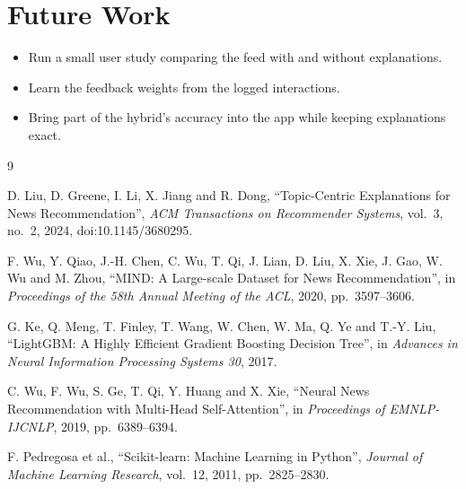 \documentclass[12pt,a4paper,oneside]{report}
\begin{document}
\section{Future Work}
\begin{itemize}
  \item Run a small user study comparing the feed with and without explanations.
  \item Learn the feedback weights from the logged interactions.
  \item Bring part of the hybrid's accuracy into the app while keeping explanations exact.
\end{itemize}

\begin{thebibliography}{9}
\small\singlespacing

D. Liu, D. Greene, I. Li, X. Jiang and R. Dong, ``Topic-Centric Explanations for News Recommendation'',
\emph{ACM Transactions on Recommender Systems}, vol.~3, no.~2, 2024, doi:10.1145/3680295.

F. Wu, Y. Qiao, J.-H. Chen, C. Wu, T. Qi, J. Lian, D. Liu, X. Xie, J. Gao, W. Wu and M. Zhou,
``MIND: A Large-scale Dataset for News Recommendation'', in \emph{Proceedings of the 58th Annual Meeting of
the ACL}, 2020, pp.~3597--3606.

G. Ke, Q. Meng, T. Finley, T. Wang, W. Chen, W. Ma, Q. Ye and T.-Y. Liu, ``LightGBM: A Highly Efficient
Gradient Boosting Decision Tree'', in \emph{Advances in Neural Information Processing Systems 30}, 2017.

C. Wu, F. Wu, S. Ge, T. Qi, Y. Huang and X. Xie, ``Neural News Recommendation with Multi-Head
Self-Attention'', in \emph{Proceedings of EMNLP-IJCNLP}, 2019, pp.~6389--6394.

F. Pedregosa et al., ``Scikit-learn: Machine Learning in Python'', \emph{Journal of Machine Learning
Research}, vol.~12, 2011, pp.~2825--2830.

\end{thebibliography}
\end{document}
